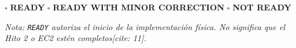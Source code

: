 \documentclass[11pt, a4paper]{article}
\begin{document}
\vspace{0.8cm}
\begin{tcolorbox}[colback=ucbblue!5, colframe=ucbblue, title=\textbf{Clasificación Docente (Status)[cite: 11]}]
    \centering
    $\square$ \textbf{READY} \qquad $\square$ \textbf{READY WITH MINOR CORRECTION} \qquad $\square$ \textbf{NOT READY}
    
    \vspace{0.3cm}
    \raggedright
    \textit{Nota: \texttt{READY} autoriza el inicio de la implementación física. No significa que el Hito 2 o EC2 estén completos[cite: 11].}
\end{tcolorbox}
\end{document}
